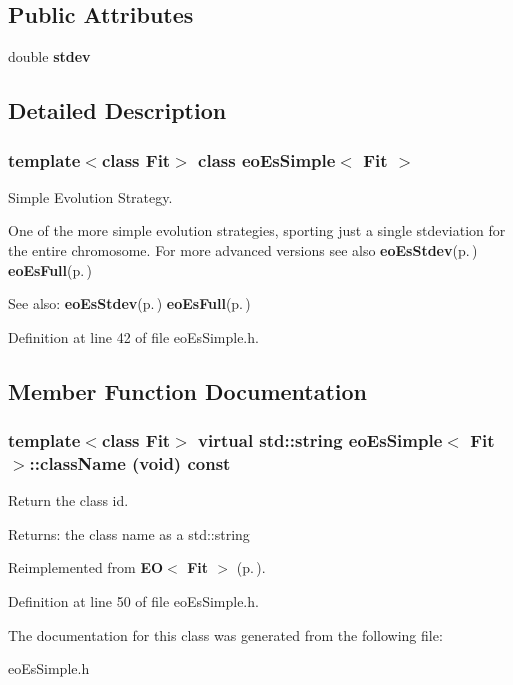 \subsection*{Public Attributes}
\begin{CompactItemize}
\item 
double {\bf stdev}\label{classeo_es_simple_o0}

\end{CompactItemize}


\subsection{Detailed Description}
\subsubsection*{template$<$class Fit$>$ class eo\-Es\-Simple$<$ Fit $>$}

Simple Evolution Strategy. 

One of the more simple evolution strategies, sporting just a single stdeviation for the entire chromosome. For more advanced versions see also {\bf eo\-Es\-Stdev}{\rm (p.\,\pageref{classeo_es_stdev})} {\bf eo\-Es\-Full}{\rm (p.\,\pageref{classeo_es_full})}

\begin{Desc}
\item[See also:]{\bf eo\-Es\-Stdev}{\rm (p.\,\pageref{classeo_es_stdev})} {\bf eo\-Es\-Full}{\rm (p.\,\pageref{classeo_es_full})} \end{Desc}




Definition at line 42 of file eo\-Es\-Simple.h.

\subsection{Member Function Documentation}
\subsubsection{\setlength{\rightskip}{0pt plus 5cm}template$<$class Fit$>$ virtual std::string {\bf eo\-Es\-Simple}$<$ Fit $>$::class\-Name (void) const\hspace{0.3cm}{\tt  [inline, virtual]}}\label{classeo_es_simple_a1}


Return the class id. 

\begin{Desc}
\item[Returns:]the class name as a std::string \end{Desc}


Reimplemented from {\bf EO$<$ Fit $>$} {\rm (p.\,\pageref{class_e_o_z10_0})}.

Definition at line 50 of file eo\-Es\-Simple.h.

The documentation for this class was generated from the following file:\begin{CompactItemize}
\item 
eo\-Es\-Simple.h\end{CompactItemize}
